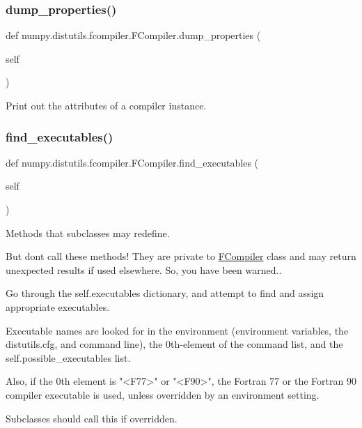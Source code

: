 \subsubsection{\texorpdfstring{dump\+\_\+properties()}{dump\_properties()}}
{\footnotesize\ttfamily def numpy.\+distutils.\+fcompiler.\+F\+Compiler.\+dump\+\_\+properties (\begin{DoxyParamCaption}\item[{}]{self }\end{DoxyParamCaption})}

\begin{DoxyVerb}Print out the attributes of a compiler instance.\end{DoxyVerb}
 \mbox{\label{classnumpy_1_1distutils_1_1fcompiler_1_1FCompiler_a9dc623a5d302a30ae0a9ebad1d7d09df}} 
\subsubsection{\texorpdfstring{find\+\_\+executables()}{find\_executables()}}
{\footnotesize\ttfamily def numpy.\+distutils.\+fcompiler.\+F\+Compiler.\+find\+\_\+executables (\begin{DoxyParamCaption}\item[{}]{self }\end{DoxyParamCaption})}



Methods that subclasses may redefine. 

But don\textquotesingle{}t call these methods! They are private to \hyperlink{classnumpy_1_1distutils_1_1fcompiler_1_1FCompiler}{F\+Compiler} class and may return unexpected results if used elsewhere. So, you have been warned.. \begin{DoxyVerb}Go through the self.executables dictionary, and attempt to
find and assign appropriate executables.

Executable names are looked for in the environment (environment
variables, the distutils.cfg, and command line), the 0th-element of
the command list, and the self.possible_executables list.

Also, if the 0th element is "<F77>" or "<F90>", the Fortran 77
or the Fortran 90 compiler executable is used, unless overridden
by an environment setting.

Subclasses should call this if overridden.
\end{DoxyVerb}
 \mbox{\label{classnumpy_1_1distutils_1_1fcompiler_1_1FCompiler_a3ee435b728176c2ddeba601eb266646d}} 
